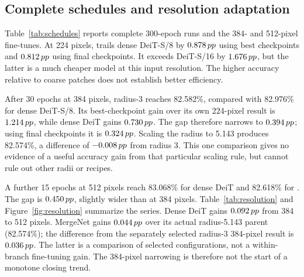 \subsection{Complete schedules and resolution adaptation}

Table~\ref{tab:schedules} reports complete 300-epoch runs and the 384- and
512-pixel fine-tunes. At 224 pixels, \mn{} trails dense DeiT-S/8 by
$0.878\,pp$ using best checkpoints and $0.812\,pp$ using final checkpoints. It
exceeds DeiT-S/16 by $1.676\,pp$, but the latter is a much cheaper model at
this input resolution. The higher accuracy relative to coarse patches does
not establish better efficiency.

\begin{table}[t]
\centering\small

\caption{Complete main runs. Fine-tunes initialize from the corresponding
EMA checkpoint: 384-pixel runs from 300-epoch 224-pixel weights, and
512-pixel runs from the 384-pixel stage. The 512-pixel \mn{} run uses the
radius-5.143 384-pixel EMA file and $R=6.857$. The selected \mn{} scratch
configuration uses a higher learning rate than dense DeiT; the fine-tuning
recipe is shared. Best and final checkpoints are kept distinct; fine-tuning
best-epoch indices are relative to that stage.}
\label{tab:schedules}
\end{table}

After 30 epochs at 384 pixels, radius-3 \mn{} reaches 82.582\%, compared with
82.976\% for dense DeiT-S/8. Its best-checkpoint gain over its own 224-pixel
result is $1.214\,pp$, while dense DeiT gains $0.730\,pp$. The gap therefore
narrows to $0.394\,pp$; using final checkpoints it is $0.324\,pp$. Scaling the
radius to 5.143 produces 82.574\%, a difference of $-0.008\,pp$ from radius 3.
This one comparison gives no evidence of a useful accuracy gain from that
particular scaling rule, but cannot rule out other radii or recipes.

A further 15 epochs at 512 pixels reach 83.068\% for dense DeiT and 82.618\%
for \mn{}. The gap is $0.450\,pp$, slightly wider than at 384 pixels.
Table~\ref{tab:resolution} and Figure~\ref{fig:resolution} summarize the
series. Dense DeiT gains $0.092\,pp$ from 384 to 512 pixels. MergeNet gains
$0.044\,pp$ over its actual radius-5.143 parent (82.574\%); the difference
from the separately selected radius-3 384-pixel result is $0.036\,pp$.
The latter is a comparison of selected configurations, not a within-branch
fine-tuning gain. The 384-pixel narrowing is therefore not the start of a
monotone closing trend.

